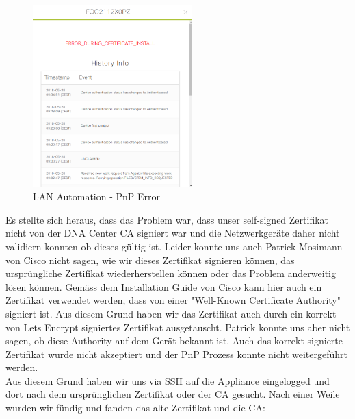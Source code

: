 \begin{figure}[H]
	\centering
	\includegraphics[height=7cm]{img/secondtry/dna-pnp-cert-error.png}
	\caption{LAN Automation - PnP Error}
	\label{fig:dna-pnp-cert-error}
\end{figure}

Es stellte sich heraus, dass das Problem war, dass unser self-signed Zertifikat nicht von der DNA Center CA signiert war und die Netzwerkgeräte daher nicht validiern konnten ob dieses gültig ist. Leider konnte uns auch Patrick Mosimann von Cisco nicht sagen, wie wir dieses Zertifikat signieren können, das ursprüngliche Zertifikat wiederherstellen können oder das Problem anderweitig lösen können. Gemäss dem Installation Guide von Cisco \cite{cisco-dna-installation-guide} kann hier auch ein Zertifikat verwendet werden, dass von einer "Well-Known Certificate Authority" signiert ist. Aus diesem Grund haben wir das Zertifikat auch durch ein korrekt von Lets Encrypt signiertes Zertifikat ausgetauscht. Patrick konnte uns aber nicht sagen, ob diese Authority auf dem Gerät bekannt ist. Auch das korrekt signierte Zertifikat wurde nicht akzeptiert und der PnP Prozess konnte nicht weitergeführt werden. \\
Aus diesem Grund haben wir uns via SSH auf die Appliance eingelogged und dort nach dem ursprünglichen Zertifikat oder der CA gesucht. Nach einer Weile wurden wir fündig und fanden das alte Zertifikat und die CA:\\

